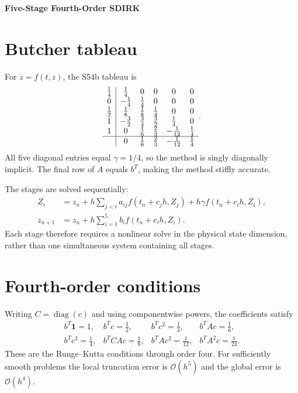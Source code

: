 \documentclass[11pt,a4paper]{article}
\begin{document}
\begin{center}
 {\LARGE\bfseries\color{gcblue}Five-Stage Fourth-Order SDIRK}\par
 \vspace{0.35em}{\large Skvortsov S54b non-geometric reference method}
\end{center}

\section{Butcher tableau}

For $\dot z=f(t,z)$, the S54b tableau is
\[
\begin{array}{c|ccccc}
\tfrac14&\tfrac14&0&0&0&0\\
0&-\tfrac14&\tfrac14&0&0&0\\
\tfrac12&\tfrac18&\tfrac18&\tfrac14&0&0\\
1&-\tfrac32&\tfrac34&\tfrac32&\tfrac14&0\\
1&0&\tfrac16&\tfrac23&-\tfrac1{12}&\tfrac14\\ \hline
&0&\tfrac16&\tfrac23&-\tfrac1{12}&\tfrac14
\end{array}.
\]
All five diagonal entries equal $\gamma=1/4$, so the method is singly
diagonally implicit.  The final row of $A$ equals $b^T$, making the method
stiffly accurate.

The stages are solved sequentially:
\begin{align}
 Z_i&=z_n+h\sum_{j<i}a_{ij}f(t_n+c_jh,Z_j)
      +h\gamma f(t_n+c_ih,Z_i),\\
 z_{n+1}&=z_n+h\sum_{i=1}^{5}b_i f(t_n+c_ih,Z_i).
\end{align}
Each stage therefore requires a nonlinear solve in the physical state
dimension, rather than one simultaneous system containing all stages.

\section{Fourth-order conditions}

Writing $C=\operatorname{diag}(c)$ and using componentwise powers, the
coefficients satisfy
\[
\begin{array}{llll}
b^T\mathbf 1=1,&b^Tc=\tfrac12,&b^Tc^2=\tfrac13,&b^TAc=\tfrac16,\\
b^Tc^3=\tfrac14,&b^TCAc=\tfrac18,&b^TAc^2=\tfrac1{12},&b^TA^2c=\tfrac1{24}.
\end{array}
\]
These are the Runge--Kutta conditions through order four.  For sufficiently
smooth problems the local truncation error is $\mathcal O(h^5)$ and the global
error is $\mathcal O(h^4)$.
\end{document}
